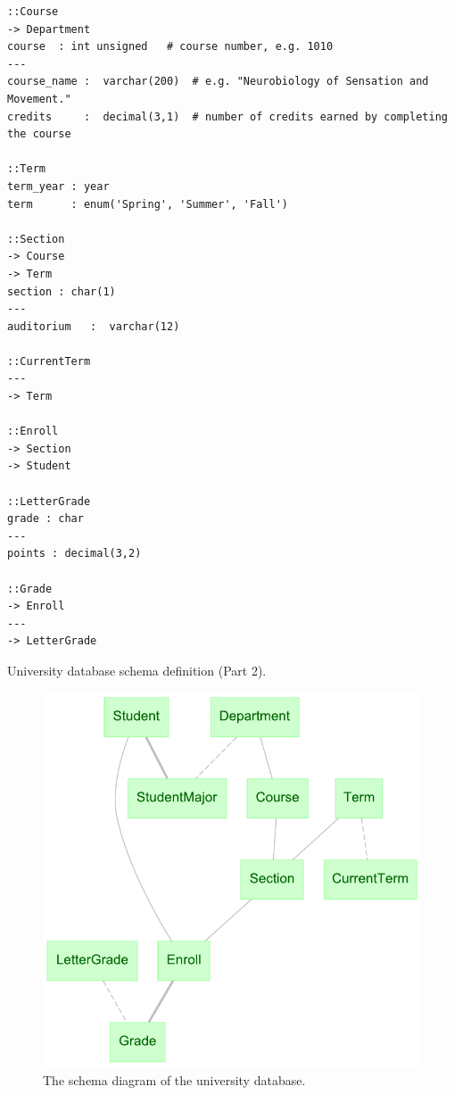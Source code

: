 \documentclass[letter,10pt]{article}
\begin{document}
\begin{lstfloat*}
\begin{lstlisting}[language=dj]
::Course     
-> Department
course  : int unsigned   # course number, e.g. 1010
---
course_name :  varchar(200)  # e.g. "Neurobiology of Sensation and Movement."
credits     :  decimal(3,1)  # number of credits earned by completing the course

::Term
term_year : year 
term      : enum('Spring', 'Summer', 'Fall')

::Section 
-> Course
-> Term 
section : char(1)
---
auditorium   :  varchar(12)

::CurrentTerm
---
-> Term

::Enroll
-> Section
-> Student 

::LetterGrade
grade : char
---
points : decimal(3,2)

::Grade 
-> Enroll
---
-> LetterGrade

\end{lstlisting}
\caption{University database schema definition (Part 2).}
\end{lstfloat*}

\begin{figure}
\includegraphics[width=\columnwidth]{uni_erd.pdf}
\caption{The schema diagram of the university database.}
\label{fig:erd}
\end{figure}
\end{document}
